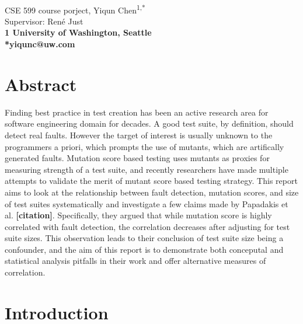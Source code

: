 \documentclass[10pt,letterpaper]{article}
\newcommand{\hl}[2]{{\color{#1}\bfseries [#2]}}
\newcommand{\todo}[1]{\hl{red}{#1}}
\begin{document}
\vspace*{0.35in}

\begin{flushleft}
{\Large
\textbf{}
}
\newline
\\
CSE 599 course porject, Yiqun Chen\textsuperscript{1,*}\\
Supervisor: Ren\'e Just \\

\bigskip
\bf{1} University of Washington, Seattle
\\
\bigskip
*yiqunc@uw.com
\end{flushleft}



\section*{Abstract}
Finding best practice in test creation has been an active research area for software engineering domain for decades. A good test suite, by definition, should detect real faults. However the target of interest is usually unknown to the programmers a priori, which prompts the use of mutants, which are artifically generated faults. Mutation score based testing uses mutants as proxies for measuring strength of a test suite, and recently researchers have made multiple attempts to validate the merit of mutant score based testing strategy. This report aims to look at the relationship between fault detection, mutation scores, and size of test suites systematically and investigate a few claims made by Papadakis et al. \todo{\textbf{citation}}. Specifically, they argued that while mutation score is highly correlated with fault detection, the correlation decreases after adjusting for test suite sizes. This observation leads to their conclusion of test suite size being a confounder, and the aim of this report is to demonstrate both conceputal and statistical analysis pitfalls in their work and offer alternative measures of correlation.




\section{Introduction}
\end{document}
